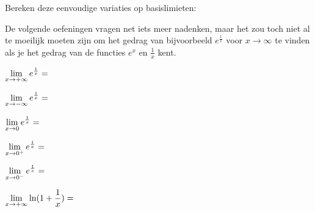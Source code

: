 \documentclass{ximera}
\begin{document}
\begin{exercise} Bereken deze eenvoudige variaties op basislimieten:

		De volgende oefeningen vragen net iets meer nadenken, maar het zou toch niet al te moeilijk moeten zijn om het gedrag van bijvoorbeeld $e^{\frac1x}$ voor $x\to\infty$ te vinden als je het gedrag van de functies $e^x$ en $\frac1x$ kent.				

		\begin{question} \def\isD{correct}   $\limxi    e^{\frac 1x} = \;$   \localoefoptions \end{question}
		\begin{question} \def\isC{correct}   $\limxmi   e^{\frac 1x} = \;$   \localoefoptions \end{question}
		\begin{question} \def\isE{correct}   $\limx     e^{\frac 1x} = \;$   \localoefoptions \end{question}
		\begin{question} \def\isA{correct}   $\rlimx    e^{\frac 1x} = \;$   \localoefoptions \end{question}
		\begin{question} \def\isC{correct}   $\llimx    e^{\frac 1x} = \;$   \localoefoptions \end{question}
		\begin{question} \def\isC{correct}   $\limxi    \ln(1+ \frac 1x) = \;$ \localoefoptions \end{question}
		

\end{exercise}
\end{document}
